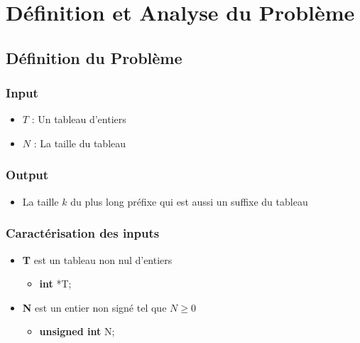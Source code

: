 %

\section{Définition et Analyse du Problème}\label{analyse}
\subsection{Définition du Problème}

\subsubsection{Input}
\begin{itemize}
   \item $T$ : Un tableau d'entiers
   \item $N$ : La taille du tableau
\end{itemize}

\subsubsection{Output}
\begin{itemize}
   \item La taille $k$ du plus long préfixe qui est aussi un suffixe du tableau
\end{itemize}

\subsubsection{Caractérisation des inputs}
\begin{itemize}
   \item \textbf{T} est un tableau non nul d'entiers
      \begin{itemize}
         \item \textbf{int} *T;
      \end{itemize}
   \item \textbf{N} est un entier non signé tel que $N \geq 0$
      \begin{itemize}
         \item \textbf{unsigned int} N;
      \end{itemize}
\end{itemize}

